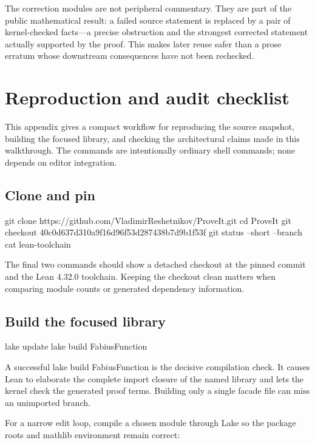 \documentclass[11pt,a4paper,openany]{book}
\def\code#1{#1}
\newcommand{\code}[1]{\texttt{\detokenize{#1}}}
\begin{document}
\begin{correction}
The correction modules are not peripheral commentary.  They are part of the
public mathematical result: a failed source statement is replaced by a pair
of kernel-checked facts---a precise obstruction and the strongest corrected
statement actually supported by the proof.  This makes later reuse safer than
a prose erratum whose downstream consequences have not been rechecked.
\end{correction}

\chapter{Reproduction and audit checklist}
\label{app:reproduction}
This appendix gives a compact workflow for reproducing the source snapshot,
building the focused library, and checking the architectural claims made in
this walkthrough.  The commands are intentionally ordinary shell commands;
none depends on editor integration.

\section{Clone and pin}
\begin{ShellCode}
git clone https://github.com/VladimirReshetnikov/ProveIt.git
cd ProveIt
git checkout 40c0d637d310a9f16d96f53d287438b7d9b1f53f
git status --short --branch
cat lean-toolchain
\end{ShellCode}
The final two commands should show a detached checkout at the pinned commit and
the Lean 4.32.0 toolchain.  Keeping the checkout clean matters when comparing
module counts or generated dependency information.

\section{Build the focused library}
\begin{ShellCode}
lake update
lake build FabiusFunction
\end{ShellCode}
A successful \code{lake build FabiusFunction} is the decisive compilation
check.  It causes Lean to elaborate the complete import closure of the named
library and lets the kernel check the generated proof terms.  Building only a
single facade file can miss an unimported branch.

For a narrow edit loop, compile a chosen module through Lake so the package
roots and mathlib environment remain correct:
\end{document}
